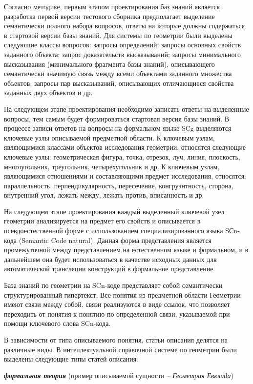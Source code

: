 Согласно методике, первым этапом проектирования баз знаний является разработка первой версии тестового сборника предполагает выделение семантически полного набора вопросов, ответы на которые должны содержаться в стартовой версии базы знаний. Для системы по геометрии были выделены следующие классы вопросов: запросы определений; запросы основных свойств заданного объекта; запрос доказательств высказываний; запросы минимального высказывания (минимального фрагмента базы знаний), описывающего семантически значимую связь между всеми объектами заданного множества объектов; запросы пар высказываний, описывающих отличающиеся свойства заданных двух объектов и др.

На следующем этапе проектирования необходимо записать ответы на выделенные вопросы, тем самым будет формироваться стартовая версия базы знаний. В процессе записи ответов на вопросы на формальном языке SCg выделяются ключевые узлы описываемой предметной области. К ключевым узлам, являющимися классами объектов исследования геометрии, относятся следующие ключевые узлы: геометрическая фигура, точка, отрезок, луч, линия, плоскость, многоугольник, треугольник, четырехугольник и др. К ключевым узлам, являющимися отношениями и составляющими предмет исследования, относятся: параллельность, перпендикулярность, пересечение, конгруэнтность, сторона, внутренний угол, лежать между, лежать против, вписанность и др.

На следующем этапе проектирования каждый выделенный ключевой узел геометрии анализируется на предмет его свойств и описывается в псевдоестественной форме с использованием специализированного языка SСn-кода (Semantic Code natural). Данная форма представления является промежуточной между представлением на естественном языке и формальном, и в дальнейшем она будет использоваться в качестве исходных данных для автоматической трансляции конструкций в формальное представление.

База знаний по геометрии на SCn-коде представляет собой семантически структурированный гипертекст. Все понятия из предметной области Геометрии имеют связи между собой, связи реализуются в виде ссылок, что позволяет переходить от понятия к понятию по определенной связи, указываемой при помощи ключевого слова SCn-кода.

В зависимости от типа описываемого понятия, статьи описания делятся на различные виды. В интеллектуальной справочной системе по геометрии были выделены следующие типы статей описания:

\textbf{\textit{формальная теория}} (пример описываемой сущности -- \textit{Геометрия Евклида})

